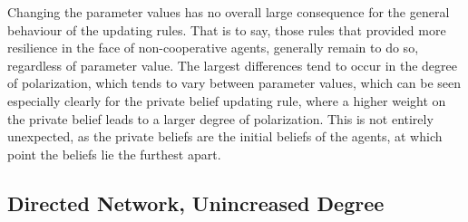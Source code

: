 \documentclass[a4paper, 12pt]{report}
\begin{document}
Changing the parameter values has no overall large consequence for the general behaviour of the updating rules. That is to say, those rules that provided more resilience in the face of non-cooperative agents, generally remain to do so, regardless of parameter value. The largest differences tend to occur in the degree of polarization, which tends to vary between parameter values, which can be seen especially clearly for the private belief updating rule, where a higher weight on the private belief leads to a larger degree of polarization. This is not entirely unexpected, as the private beliefs are the initial beliefs of the agents, at which point the beliefs lie the furthest apart.

\newpage

\subsection{Directed Network, Unincreased Degree}
\end{document}
